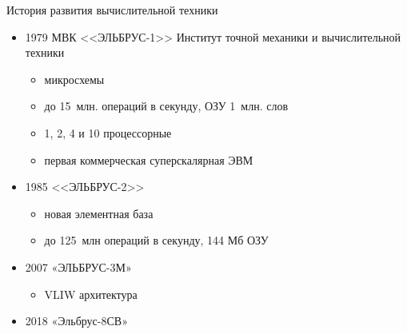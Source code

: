 \documentclass[aspectratio=169,14pt]{beamer}
\begin{document}
\begin{frame}{История развития вычислительной техники}
    \begin{itemize}
        \item 1979 МВК <<ЭЛЬБРУС-1>> Институт точной механики и вычислительной техники
        \begin{itemize}
            \item микросхемы
            \item до 15~млн. операций в секунду, ОЗУ 1~млн. слов
            \item 1, 2, 4 и 10 процессорные
            \item первая коммерческая суперскалярная ЭВМ
        \end{itemize}
        \item 1985 <<ЭЛЬБРУС-2>>
        \begin{itemize}
            \item новая элементная база
            \item до 125~млн операций в секунду, 144 Мб ОЗУ
        \end{itemize}
        \item 2007 «ЭЛЬБРУС-3М»
        \begin{itemize}
            \item VLIW архитектура
        \end{itemize}
        \item 2018 «Эльбрус-8СВ»
        \begin{itemize}
        \end{itemize}
    \end{itemize}
\end{frame}
\end{document}
